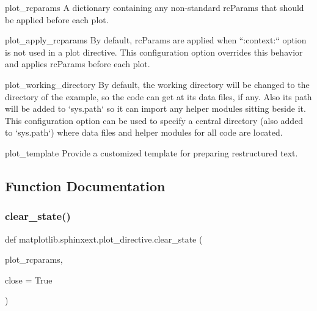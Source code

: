 \begin{DoxyVerb}
    plot_rcparams
A dictionary containing any non-standard rcParams that should
be applied before each plot.

    plot_apply_rcparams
By default, rcParams are applied when ``:context:`` option is not used
in a plot directive.  This configuration option overrides this behavior
and applies rcParams before each plot.

    plot_working_directory
By default, the working directory will be changed to the directory of
the example, so the code can get at its data files, if any.  Also its
path will be added to `sys.path` so it can import any helper modules
sitting beside it.  This configuration option can be used to specify
a central directory (also added to `sys.path`) where data files and
helper modules for all code are located.

    plot_template
Provide a customized template for preparing restructured text.
\end{DoxyVerb}
 

\subsection{Function Documentation}
\mbox{\label{namespacematplotlib_1_1sphinxext_1_1plot__directive_acb32ad5cc5808aa47f003754f035b381}} 
\subsubsection{\texorpdfstring{clear\+\_\+state()}{clear\_state()}}
{\footnotesize\ttfamily def matplotlib.\+sphinxext.\+plot\+\_\+directive.\+clear\+\_\+state (\begin{DoxyParamCaption}\item[{}]{plot\+\_\+rcparams,  }\item[{}]{close = {\ttfamily True} }\end{DoxyParamCaption})}

\mbox{\label{namespacematplotlib_1_1sphinxext_1_1plot__directive_a0a70b327f0fd8ab814d9c823b0df89e3}} 
